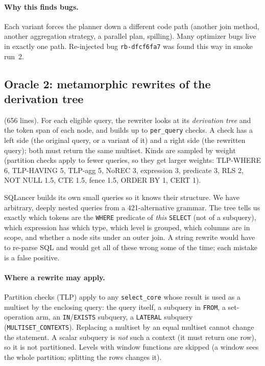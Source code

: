 \paragraph{Why this finds bugs.} Each variant forces the planner down a
different code path (another join method, another aggregation strategy, a
parallel plan, spilling). Many optimizer bugs live in exactly one path.
Re-injected bug \texttt{rb-dfcf6fa7} was found this way in smoke run~2.

\subsection{Oracle 2: metamorphic rewrites of the derivation tree}
\label{sec:mm}

 (656 lines). For each eligible query, the
rewriter looks at its \emph{derivation tree} and the token span of each node,
and builds up to \texttt{per\_query} checks. A check has a left side (the
original query, or a variant of it) and a right side (the rewritten query);
both must return the same multiset. Kinds are sampled by weight (partition
checks apply to fewer queries, so they get larger weights: TLP-WHERE 6,
TLP-HAVING 5, TLP-agg 5, NoREC 3, expression 3, predicate 3, RLS 2, NOT NULL
1.5, CTE 1.5, fence 1.5, ORDER BY 1, CERT 1).

\begin{keybox}
SQLancer builds its own small queries so it knows their structure. We have
arbitrary, deeply nested queries from a 421-alternative grammar. The tree tells
us exactly which tokens are the \texttt{WHERE} predicate of \emph{this}
\texttt{SELECT} (not of a subquery), which expression has which type, which
level is grouped, which columns are in scope, and whether a node sits under an
outer join. A string rewrite would have to re-parse SQL and would get all of
these wrong some of the time; each mistake is a false positive.
\end{keybox}

\paragraph{Where a rewrite may apply.} Partition checks (TLP) apply to any
\texttt{select\_core} whose result is used as a multiset by the enclosing
query: the query itself, a subquery in \texttt{FROM}, a set-operation arm, an
\texttt{IN}/\texttt{EXISTS} subquery, a \texttt{LATERAL} subquery
(\texttt{MULTISET\_CONTEXTS}). Replacing a multiset by an equal multiset cannot
change the statement. A scalar subquery is \emph{not} such a context (it must
return one row), so it is not partitioned. Levels with window functions are
skipped (a window sees the whole partition; splitting the rows changes it).

